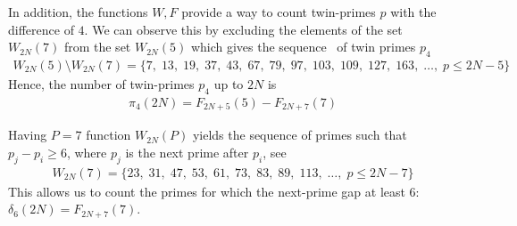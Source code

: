 In addition, the functions $W, F$ provide a way to count twin-primes $p$ with the difference of $4$.
We can observe this by excluding the elements of the set $W_{2N}(7)$ from the set $W_{2N}(5)$ which gives
the sequence~\cite{oeis:A023200} of twin primes $p_4$
\begin{align*}
    W_{2N}(5) \setminus W_{2N}(7) = \{ 7, \; 13, \; 19, \; 37, \; 43, \; 67, \; 79, \; 97, \; 103, \; 109, \; 127, \; 163, \; \dots, \;  p \leq 2N - 5 \}
\end{align*}
Hence, the number of twin-primes $p_4$ up to $2N$ is
\begin{align*}
    \pi_4 (2N) = F_{2N+5}(5) - F_{2N+7}(7)
\end{align*}

Having $P=7$ function $W_{2N}(P)$ yields the sequence of primes such that $p_j-p_i \geq 6$,
where $p_j$ is the next prime after $p_i$, see~\cite{oeis:A124582}
\begin{align*}
    W_{2N}(7) = \{ 23, \; 31, \;  47, \; 53, \; 61, \;  73, \; 83, \; 89, \; 113, \; \dots, \; p \leq 2N-7 \}
\end{align*}
This allows us to count the primes for which the next-prime gap at least 6: $\delta_6(2N) = F_{2N+7}(7)$.
